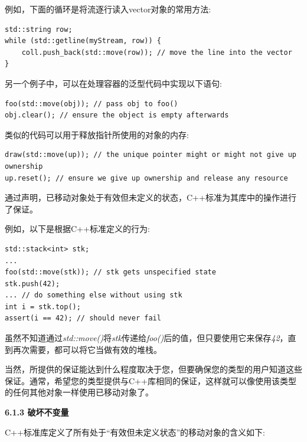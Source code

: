 例如，下面的循环是将流逐行读入vector对象的常用方法:\par

\begin{lstlisting}[caption={}]
std::string row;
while (std::getline(myStream, row)) {
	coll.push_back(std::move(row)); // move the line into the vector
}
\end{lstlisting}

另一个例子中，可以在处理容器的泛型代码中实现以下语句:\par

\begin{lstlisting}[caption={}]
foo(std::move(obj)); // pass obj to foo()
obj.clear(); // ensure the object is empty afterwards
\end{lstlisting}

类似的代码可以用于释放指针所使用的对象的内存:\par

\begin{lstlisting}[caption={}]
draw(std::move(up)); // the unique pointer might or might not give up ownership
up.reset(); // ensure we give up ownership and release any resource
\end{lstlisting}

通过声明，已移动对象处于有效但未定义的状态，C++标准为其库中的操作进行了保证。\par

例如，以下是根据C++标准定义的行为:\par

\begin{lstlisting}[caption={}]
std::stack<int> stk;
...
foo(std::move(stk)); // stk gets unspecified state
stk.push(42);
... // do something else without using stk
int i = stk.top();
assert(i == 42); // should never fail
\end{lstlisting}

虽然不知道通过\textit{std::move()}将\textit{stk}传递给\textit{foo()}后的值，但只要使用它来保存\textit{42}，直到再次需要，都可以将它当做有效的堆栈。\par

当然，所提供的保证能达到什么程度取决于您，但要确保您的类型的用户知道这些保证。通常，希望您的类型提供与C++库相同的保证，这样就可以像使用该类型的任何其他对象一样使用已移动对象了。\par

\hspace*{\fill} \par %
\textbf{6.1.3 破坏不变量}

C++标准库定义了所有处于“有效但未定义状态”的移动对象的含义如下:\par

